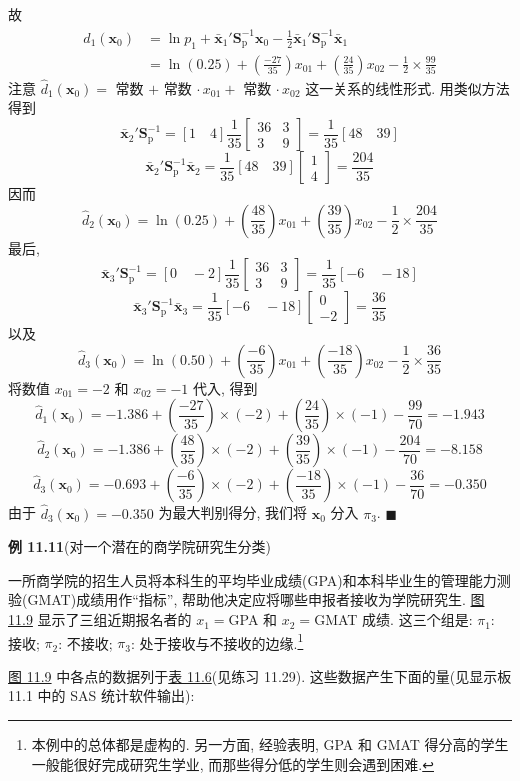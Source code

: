 
故
\[
\begin{aligned}
\hat{d}_1(\mathbf{x}_0)&=\ln p_1+\bar{\mathbf{x}}_1'\mathbf{S}_{\mathrm{p}}^{-1}\mathbf{x}_0-\frac{1}{2}\bar{\mathbf{x}}_1'\mathbf{S}_{\mathrm{p}}^{-1}\bar{\mathbf{x}}_1\\
&=\ln(0.25)+\left(\frac{-27}{35}\right)x_{01}+\left(\frac{24}{35}\right)x_{02}-\frac{1}{2}\times\frac{99}{35}
\end{aligned}
\]
注意 $\hat{d}_1(\mathbf{x}_0)=$ 常数 $+$ 常数 $\cdot\,x_{01}+$ 常数 $\cdot\,x_{02}$ 这一关系的线性形式. 用类似方法得到
\[
\bar{\mathbf{x}}_2'\mathbf{S}_{\mathrm{p}}^{-1}=[1\quad 4]\frac{1}{35}\begin{bmatrix}36&3\\3&9\end{bmatrix}=\frac{1}{35}[48\quad 39]
\]
\[
\bar{\mathbf{x}}_2'\mathbf{S}_{\mathrm{p}}^{-1}\bar{\mathbf{x}}_2=\frac{1}{35}[48\quad 39]\begin{bmatrix}1\\4\end{bmatrix}=\frac{204}{35}
\]
因而
\[
\hat{d}_2(\mathbf{x}_0)=\ln(0.25)+\left(\frac{48}{35}\right)x_{01}+\left(\frac{39}{35}\right)x_{02}-\frac{1}{2}\times\frac{204}{35}
\]
最后,
\[
\bar{\mathbf{x}}_3'\mathbf{S}_{\mathrm{p}}^{-1}=[0\quad -2]\frac{1}{35}\begin{bmatrix}36&3\\3&9\end{bmatrix}=\frac{1}{35}[-6\quad -18]
\]
\[
\bar{\mathbf{x}}_3'\mathbf{S}_{\mathrm{p}}^{-1}\bar{\mathbf{x}}_3=\frac{1}{35}[-6\quad -18]\begin{bmatrix}0\\-2\end{bmatrix}=\frac{36}{35}
\]
以及
\[
\hat{d}_3(\mathbf{x}_0)=\ln(0.50)+\left(\frac{-6}{35}\right)x_{01}+\left(\frac{-18}{35}\right)x_{02}-\frac{1}{2}\times\frac{36}{35}
\]
将数值 $x_{01}=-2$ 和 $x_{02}=-1$ 代入, 得到
\[
\hat{d}_1(\mathbf{x}_0)=-1.386+\left(\frac{-27}{35}\right)\times(-2)+\left(\frac{24}{35}\right)\times(-1)-\frac{99}{70}=-1.943
\]
\[
\hat{d}_2(\mathbf{x}_0)=-1.386+\left(\frac{48}{35}\right)\times(-2)+\left(\frac{39}{35}\right)\times(-1)-\frac{204}{70}=-8.158
\]
\[
\hat{d}_3(\mathbf{x}_0)=-0.693+\left(\frac{-6}{35}\right)\times(-2)+\left(\frac{-18}{35}\right)\times(-1)-\frac{36}{70}=-0.350
\]
由于 $\hat{d}_3(\mathbf{x}_0)=-0.350$ 为最大判别得分, 我们将 $\mathbf{x}_0$ 分入 $\pi_3$. \hfill$\blacksquare$

\noindent\textbf{例 11.11}\quad (对一个潜在的商学院研究生分类)

一所商学院的招生人员将本科生的平均毕业成绩(GPA)和本科毕业生的管理能力测验(GMAT)成绩用作“指标”, 帮助他决定应将哪些申报者接收为学院研究生. \hyperref[fig:11.9]{图 11.9} 显示了三组近期报名者的 $x_1=$GPA 和 $x_2=$GMAT 成绩. 这三个组是: $\pi_1$: 接收; $\pi_2$: 不接收; $\pi_3$: 处于接收与不接收的边缘.\footnote{本例中的总体都是虚构的. 另一方面, 经验表明, GPA 和 GMAT 得分高的学生一般能很好完成研究生学业, 而那些得分低的学生则会遇到困难.}

\hyperref[fig:11.9]{图 11.9} 中各点的数据列于\hyperref[tab:11.6]{表 11.6}(见练习 11.29). 这些数据产生下面的量(见显示板 11.1 中的 SAS 统计软件输出):
